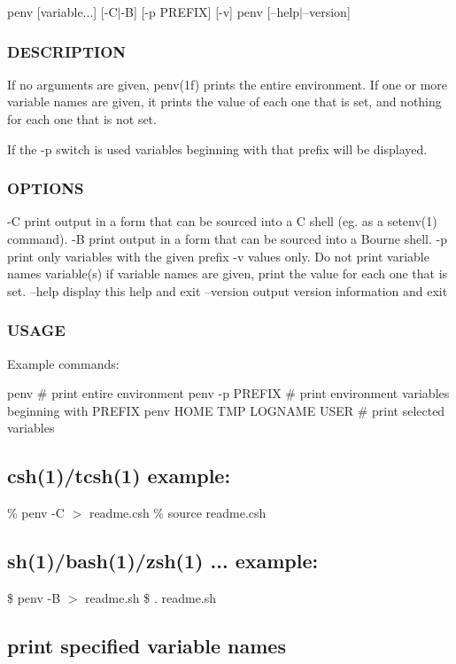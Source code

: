 penv \mbox{[}variable...\mbox{]} \mbox{[}-\/\+C$\vert$-\/B\mbox{]} \mbox{[}-\/p P\+R\+E\+F\+IX\mbox{]} \mbox{[}-\/v\mbox{]} penv \mbox{[}--help$\vert$--version\mbox{]} \subsubsection*{D\+E\+S\+C\+R\+I\+P\+T\+I\+ON}

If no arguments are given, penv(1f) prints the entire environment. If one or more variable names are given, it prints the value of each one that is set, and nothing for each one that is not set.

If the -\/p switch is used variables beginning with that prefix will be displayed. \subsubsection*{O\+P\+T\+I\+O\+NS}

-\/C print output in a form that can be sourced into a C shell (eg. as a setenv(1) command). -\/B print output in a form that can be sourced into a Bourne shell. -\/p print only variables with the given prefix -\/v values only. Do not print variable names variable(s) if variable names are given, print the value for each one that is set. --help display this help and exit --version output version information and exit

\subsubsection*{U\+S\+A\+GE}

Example commands\+:

penv \# print entire environment penv -\/p P\+R\+E\+F\+IX \# print environment variables beginning with P\+R\+E\+F\+IX penv H\+O\+ME T\+MP L\+O\+G\+N\+A\+ME U\+S\+ER \# print selected variables

\subsection*{csh(1)/tcsh(1) example\+:}

\% penv -\/C $>$ readme.\+csh \% source readme.\+csh \subsection*{sh(1)/bash(1)/zsh(1) ... example\+:}

\$ penv -\/B $>$ readme.\+sh \$ . readme.\+sh \subsection*{print specified variable names}

